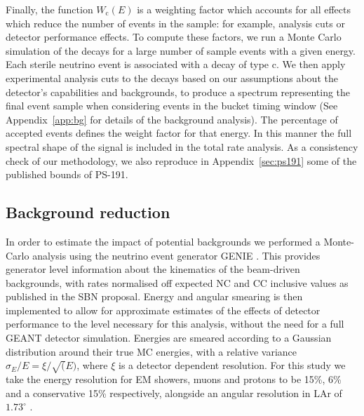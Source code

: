 \documentclass[11pt, a4paper]{article}
\newcommand{\refapp}[1]{Appendix~\ref{#1}}
\begin{document}
Finally, the function $W_\text{c}(E)$ is a weighting factor which accounts for
all effects which reduce the number of events in the sample: for example,
analysis cuts or detector performance effects. 
%
To compute these factors, we run a Monte Carlo simulation of the decays for a
large number of sample events with a given energy. Each sterile neutrino event is
associated with a decay of type $\text{c}$. We then apply experimental analysis
cuts to the decays based on our assumptions about the detector's capabilities
and backgrounds, to produce a spectrum representing the final event sample when
considering events in the bucket timing window (See \refapp{app:bg} for details
of the background analysis). The percentage of accepted events defines the
weight factor for that energy. In this manner the full spectral shape of the signal is
included in the total rate analysis. As a consistency check of our methodology, we
also reproduce in \refapp{sec:ps191} some of the published bounds of PS-191. 

\subsection{\label{sec:backgroundestimate}Background reduction}

In order to estimate the impact of potential backgrounds we performed a
Monte-Carlo analysis using the neutrino event generator GENIE
\cite{Andreopoulos:2009rq}. This provides generator level information
about the kinematics of the beam-driven backgrounds, with rates normalised off
expected NC and CC inclusive values as published in the SBN proposal. Energy
and angular smearing is then implemented to allow for approximate estimates of
the effects of detector performance to the level necessary for this analysis,
without the need for a full GEANT detector simulation. Energies are smeared
according to a Gaussian distribution around their true MC energies, with a
relative variance $\sigma_E/E = \xi/ \sqrt(E) $, where $\xi$ is a detector
dependent resolution.  For this study we take the energy resolution for EM
showers, muons and protons to be 15\%, 6\% and a conservative 15\%
respectively, alongside an angular resolution in LAr of $1.73^{\circ}$
\cite{Antonello:2015lea}. 
\end{document}
